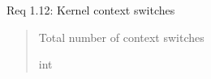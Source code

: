 \documentclass[letterpaper,10pt,english]{sphinxmanual}
\begin{document}
\begin{fulllineitems}
\begin{fulllineitems}
\sphinxAtStartPar
Req 1.12: Kernel context switches
\begin{quote}\begin{description}
\sphinxAtStartPar
Total number of context switches

\sphinxAtStartPar
int

\end{description}\end{quote}

\end{fulllineitems}


\end{fulllineitems}

\end{document}
